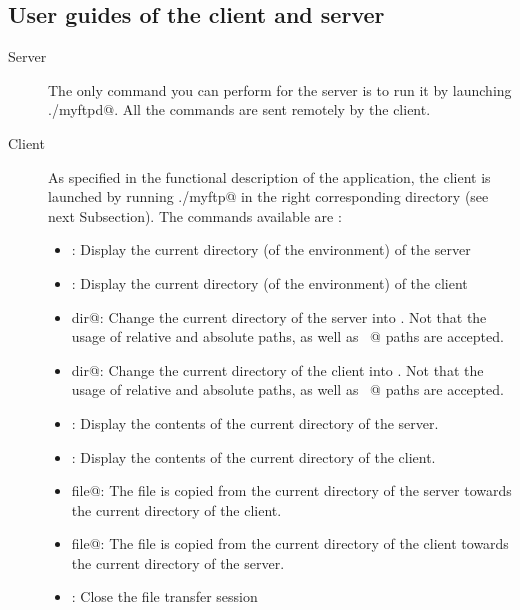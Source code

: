 \documentclass{article}
\begin{document}
\subsection{User guides of the client and server}
\begin{description}
\item[Server] The only command you can perform for the server is to run it by launching \verb@./myftpd@. All the commands are sent remotely by the client.
\item[Client] As specified in the functional description of the application, the client is launched by running \verb@./myftp@ in the right corresponding directory (see next Subsection). The commands available are :
\begin{itemize}
\item \verb@pwd@: Display the current directory (of the environment) of the server
\item \verb@lpwd@: Display the current directory (of the environment) of the client
\item \verb@cd dir@: Change the current directory of the server into \verb@dir@. Not that the usage of relative and absolute paths, as well as \verb@~@ paths  are accepted.
\item \verb@lcd dir@: Change the current directory of the client into \verb@dir@. Not that the usage of relative and absolute paths, as well as \verb@~@ paths  are accepted.
\item \verb@ls@: Display the contents of the current directory of the server.
\item \verb@lls@: Display the contents of the current directory of the client.
\item \verb@get file@: The file \verb@file@ is copied from the current directory of the server towards the current directory of the client.
\item \verb@put file@: The file \verb@file@ is copied from the current directory of the client towards the current directory of the server.
\item \verb@bye@: Close the file transfer session
\end{itemize}
\end{description}
\end{document}
